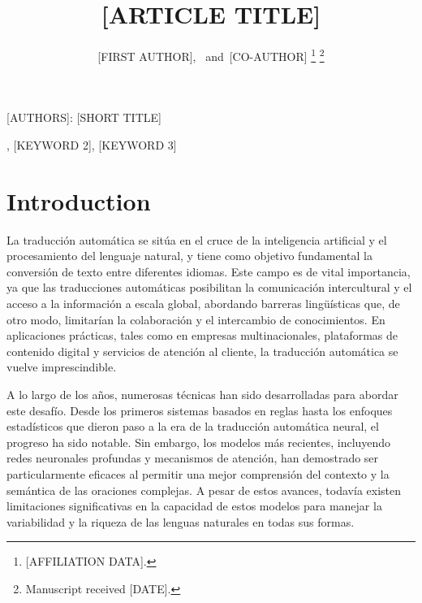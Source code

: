 \documentclass[journal]{IEEEtran}
\begin{document}
\title{[ARTICLE TITLE]}

\author{[FIRST AUTHOR],~
        and~[CO-AUTHOR]%
\thanks{[AFFILIATION DATA].}%
\thanks{Manuscript received [DATE].}}

%
{[AUTHORS]: [SHORT TITLE]}

\maketitle

\begin{abstract}
\end{abstract}

\begin{IEEEkeywords}
[KEYWORD 1], [KEYWORD 2], [KEYWORD 3]
\end{IEEEkeywords}

\IEEEpeerreviewmaketitle


\section{Introduction}
\label{sec:intro}

La traducción automática se sitúa en el cruce de la inteligencia artificial y el procesamiento del lenguaje natural, y tiene como objetivo fundamental la conversión de texto entre diferentes idiomas. Este campo es de vital importancia, ya que las traducciones automáticas posibilitan la comunicación intercultural y el acceso a la información a escala global, abordando barreras lingüísticas que, de otro modo, limitarían la colaboración y el intercambio de conocimientos. En aplicaciones prácticas, tales como en empresas multinacionales, plataformas de contenido digital y servicios de atención al cliente, la traducción automática se vuelve imprescindible.

A lo largo de los años, numerosas técnicas han sido desarrolladas para abordar este desafío. Desde los primeros sistemas basados en reglas hasta los enfoques estadísticos que dieron paso a la era de la traducción automática neural, el progreso ha sido notable. Sin embargo, los modelos más recientes, incluyendo redes neuronales profundas y mecanismos de atención, han demostrado ser particularmente eficaces al permitir una mejor comprensión del contexto y la semántica de las oraciones complejas. A pesar de estos avances, todavía existen limitaciones significativas en la capacidad de estos modelos para manejar la variabilidad y la riqueza de las lenguas naturales en todas sus formas.
\end{document}
